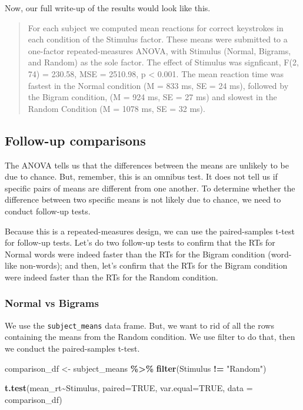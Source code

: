 \documentclass[
]{book}
\newenvironment{Shaded}{\begin{snugshade}}{\end{snugshade}}
\newcommand{\AttributeTok}[1]{\textcolor[rgb]{0.13,0.29,0.53}{#1}}
\newcommand{\ConstantTok}[1]{\textcolor[rgb]{0.56,0.35,0.01}{#1}}
\newcommand{\FunctionTok}[1]{\textcolor[rgb]{0.13,0.29,0.53}{\textbf{#1}}}
\newcommand{\NormalTok}[1]{#1}
\newcommand{\OtherTok}[1]{\textcolor[rgb]{0.56,0.35,0.01}{#1}}
\newcommand{\SpecialCharTok}[1]{\textcolor[rgb]{0.81,0.36,0.00}{\textbf{#1}}}
\newcommand{\StringTok}[1]{\textcolor[rgb]{0.31,0.60,0.02}{#1}}
\begin{document}
Now, our full write-up of the results would look like this.

\begin{quote}
For each subject we computed mean reactions for correct keystrokes in each condition of the Stimulus factor. These means were submitted to a one-factor repeated-measures ANOVA, with Stimulus (Normal, Bigrams, and Random) as the sole factor. The effect of Stimulus was signficant, F(2, 74) = 230.58, MSE = 2510.98, p \textless{} 0.001. The mean reaction time was fastest in the Normal condition (M = 833 ms, SE = 24 ms), followed by the Bigram condition, (M = 924 ms, SE = 27 ms) and slowest in the Random Condition (M = 1078 ms, SE = 32 ms).
\end{quote}

\hypertarget{follow-up-comparisons}{%
\subsection{Follow-up comparisons}\label{follow-up-comparisons}}

The ANOVA tells us that the differences between the means are unlikely to be due to chance. But, remember, this is an omnibus test. It does not tell us if specific pairs of means are different from one another. To determine whether the difference between two specific means is not likely due to chance, we need to conduct follow-up tests.

Because this is a repeated-measures design, we can use the paired-samples t-test for follow-up tests. Let's do two follow-up tests to confirm that the RTs for Normal words were indeed faster than the RTs for the Bigram condition (word-like non-words); and then, let's confirm that the RTs for the Bigram condition were indeed faster than the RTs for the Random condition.

\hypertarget{normal-vs-bigrams}{%
\subsubsection{Normal vs Bigrams}\label{normal-vs-bigrams}}

We use the \texttt{subject\_means} data frame. But, we want to rid of all the rows containing the means from the Random condition. We use filter to do that, then we conduct the paired-samples t-test.

\begin{Shaded}
\begin{Highlighting}[]
\NormalTok{comparison\_df }\OtherTok{\textless{}{-}}\NormalTok{ subject\_means }\SpecialCharTok{\%\textgreater{}\%}
                  \FunctionTok{filter}\NormalTok{(Stimulus }\SpecialCharTok{!=} \StringTok{"Random"}\NormalTok{)}

\FunctionTok{t.test}\NormalTok{(mean\_rt}\SpecialCharTok{\textasciitilde{}}\NormalTok{Stimulus, }
       \AttributeTok{paired=}\ConstantTok{TRUE}\NormalTok{, }
       \AttributeTok{var.equal=}\ConstantTok{TRUE}\NormalTok{, }
       \AttributeTok{data =}\NormalTok{ comparison\_df)}
\end{Highlighting}
\end{Shaded}
\end{document}
